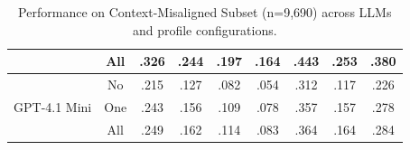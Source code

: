 \begin{table}[t]
\begin{tabular}{lcccccccc}
 & \cellcolor{darkgreen}All & \cellcolor{darkgreen}.326 & \cellcolor{darkgreen}.244 & \cellcolor{darkgreen}.197 & \cellcolor{darkgreen}.164 & \cellcolor{darkgreen}.443 & \cellcolor{darkgreen}.253 & \cellcolor{darkgreen}.380 \\ 
\midrule
\multirow{3}{*}{GPT-4.1 Mini} & No & .215 & .127 & .082 & .054 & .312 & .117 & .226 \\ 
 & \cellcolor{lightgreen}One & \cellcolor{lightgreen}.243 & \cellcolor{lightgreen}.156 & \cellcolor{lightgreen}.109 & \cellcolor{lightgreen}.078 & \cellcolor{lightgreen}.357 & \cellcolor{lightgreen}.157 & \cellcolor{lightgreen}.278 \\ 
 & \cellcolor{darkgreen}All & \cellcolor{darkgreen}.249 & \cellcolor{darkgreen}.162 & \cellcolor{darkgreen}.114 & \cellcolor{darkgreen}.083 & \cellcolor{darkgreen}.364 & \cellcolor{darkgreen}.164 & \cellcolor{darkgreen}.284 \\ 
\bottomrule
\end{tabular}
\caption{Performance on {\dataset} Context-Misaligned Subset (n=9,690) across LLMs and profile configurations.}
\label{tab:main-result-hard}
\vspace{-1pc}
\end{table}